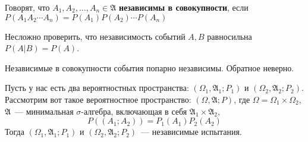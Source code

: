 \documentclass{article}
\newcommand{\A}{{\mathfrak A}}
\begin{document}
    \begin{definition}
        Говорят, что $A_1,A_2,\ldots,A_n\in\A$ \textbf{независимы в совокупности}, если
        $P(A_1A_2\cdots A_n)=P(A_1)P(A_2)\cdots P(A_n)$
    \end{definition}
    \begin{property}
        Несложно проверить, что независимость событий $A,B$ равносильна $P(A|B)=P(A)$.
    \end{property}
    \begin{property}
        Независимые в совокупности события попарно независимы. Обратное неверно.
    \end{property}
    \begin{definition}
        Пусть у нас есть два вероятностных пространства: $(\Omega_1,\A_1;P_1)$ и $(\Omega_2,\A_2;P_2)$. Рассмотрим вот такое вероятностное пространство: $(\Omega,\A;P)$, где $\Omega=\Omega_1\times\Omega_2$, $\A$~--- минимальная $\sigma$-алгебра, включающая в себя $\A_1\times\A_2$,
        $$
        P((A_1;A_2))=P_1(A_1)P_2(A_2)
        $$
        Тогда $(\Omega_1,\A_1;P_1)$ и $(\Omega_2,\A_2;P_2)$~--- независимые испытания.
    \end{definition}
\end{document}
